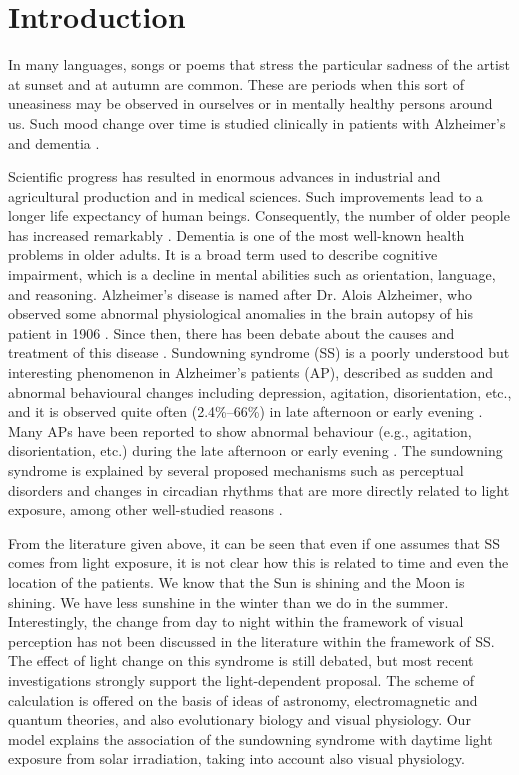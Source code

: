 \documentclass[brainsci,article,submit,moreauthors]{Definitions/mdpi}
\begin{document}
\section{Introduction}

In many languages, songs or poems that stress the particular sadness of the artist at sunset and at autumn are common. These are periods when this sort of uneasiness may be observed in ourselves or in mentally healthy persons around us. Such mood change over time is studied clinically in patients with Alzheimer's and dementia \citep{martin2000,gallagher1992}.

Scientific progress has resulted in enormous advances in industrial and agricultural production and in medical sciences. Such improvements lead to a longer life expectancy of human beings. Consequently, the number of older people has increased remarkably \citep{oecd2020}. Dementia \citep{who2017} is one of the most well-known health problems in older adults. It is a broad term used to describe cognitive impairment, which is a decline in mental abilities such as orientation, language, and reasoning. Alzheimer's disease is named after Dr. Alois Alzheimer, who observed some abnormal physiological anomalies in the brain autopsy of his patient in 1906 \citep{nih2019}. Since then, there has been debate about the causes and treatment of this disease \citep{burns2009,larson2013}. Sundowning syndrome (SS) is a poorly understood but interesting phenomenon in Alzheimer's patients (AP), described as sudden and abnormal behavioural changes including depression, agitation, disorientation, etc., and it is observed quite often (2.4\%--66\%) in late afternoon or early evening \citep{martin2000,gallagher1992}. Many APs have been reported to show abnormal behaviour (e.g., agitation, disorientation, etc.) during the late afternoon or early evening \citep{khachiyants2011}. The sundowning syndrome is explained by several proposed mechanisms such as perceptual disorders \citep{martin2000,khachiyants2011} and changes in circadian rhythms \citep{cohenmansfield1989} that are more directly related to light exposure, among other well-studied reasons \citep{khachiyants2011}.

From the literature given above, it can be seen that even if one assumes that SS comes from light exposure, it is not clear how this is related to time and even the location of the patients. We know that the Sun is shining and the Moon is shining. We have less sunshine in the winter than we do in the summer. Interestingly, the change from day to night within the framework of visual perception has not been discussed in the literature within the framework of SS. The effect of light change on this syndrome is still debated, but most recent investigations strongly support the light-dependent proposal. The scheme of calculation is offered on the basis of ideas of astronomy, electromagnetic and quantum theories, and also evolutionary biology and visual physiology. Our model explains the association of the sundowning syndrome with daytime light exposure from solar irradiation, taking into account also visual physiology.
\end{document}
